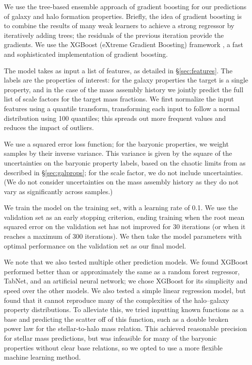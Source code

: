 We use the tree-based ensemble approach of gradient boosting \citep{friedman_greedy_2001} for our predictions of galaxy and halo formation properties.
Briefly, the idea of gradient boosting is to combine the results of many weak learners to achieve a strong regressor by iteratively adding trees; the residuals of the previous iteration provide the gradients.
We use the XGBoost (eXtreme Gradient Boosting) framework \citep{chen_xgboost_2016}, a fast and sophisticated implementation of gradient boosting.

The model takes as input a list of features, as detailed in \S\ref{sec:features}.
The labels are the properties of interest: for the galaxy properties the target is a single property, and in the case of the mass assembly history we jointly predict the full list of scale factors for the target mass fractions.
We first normalize the input features using a quantile transform, transforming each input to follow a normal distribution using 100 quantiles; this spreads out more frequent values and reduces the impact of outliers.

We use a squared error loss function; for the baryonic properties, we weight samples by their inverse variance.
This variance is given by the square of the uncertainties on the baryonic property labels, based on the chaotic limits from \cite{Genel2019} as described in \S\ref{sec:galprops}; for the scale factor, we do not include uncertainties.
(We do not consider uncertainties on the mass assembly history as they do not vary as significantly across samples.)

We train the model on the training set, with a learning rate of 0.1.
We use the validation set as an early stopping criterion, ending training when the root mean squared error on the validation set has not improved for 30 iterations (or when it reaches a maximum of 300 iterations).
We then take the model parameters with optimal performance on the validation set as our final model.

We note that we also tested multiple other prediction models. 
We found XGBoost performed better than or approximately the same as a random forest regressor, TabNet, and an artificial neural network; we chose XGBoost for its simplicity and speed over the other models.
We also tested a simple linear regression model, but found that it cannot reproduce many of the complexities of the halo--galaxy property distributions.
To alleviate this, we tried inputting known functions as a base and predicting the scatter off of this function, such as a double broken power law for the stellar-to-halo mass relation.
This achieved reasonable precision for stellar mass predictions, but was infeasible for many of the baryonic properties without clear base relations, so we opted to use a more flexible machine learning method.


